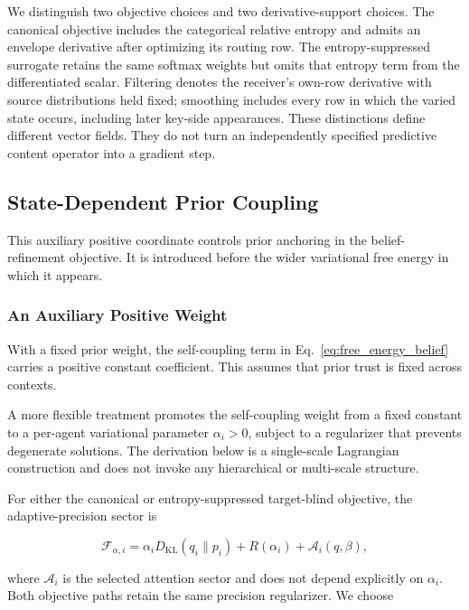 \documentclass[twoside,11pt]{article}
\begin{document}
We distinguish two objective choices and two derivative-support choices. The canonical objective includes the categorical relative entropy and admits an envelope derivative after optimizing its routing row. The entropy-suppressed surrogate retains the same softmax weights but omits that entropy term from the differentiated scalar. Filtering denotes the receiver's own-row derivative with source distributions held fixed; smoothing includes every row in which the varied state occurs, including later key-side appearances. These distinctions define different vector fields. They do not turn an independently specified predictive content operator into a gradient step.

\subsection{State-Dependent Prior Coupling}
\label{sec:state_dependent_precision}

This auxiliary positive coordinate controls prior anchoring in the belief-refinement objective. It is introduced before the wider variational free energy in which it appears.

\subsubsection{An Auxiliary Positive Weight}

With a fixed prior weight, the self-coupling term in Eq.~\eqref{eq:free_energy_belief} carries a positive constant coefficient. This assumes that prior trust is fixed across contexts.

A more flexible treatment promotes the self-coupling weight from a fixed constant to a per-agent variational parameter $\alpha_i > 0$, subject to a regularizer that prevents degenerate solutions. The derivation below is a single-scale Lagrangian construction and does not invoke any hierarchical or multi-scale structure.

For either the canonical or entropy-suppressed target-blind objective, the adaptive-precision sector is

\begin{equation}
\mathcal{F}_{\alpha,i}
=\alpha_iD_{\mathrm{KL}}(q_i\|p_i)+R(\alpha_i)+\mathcal{A}_i(q,\beta),
\label{eq:free_energy_adaptive}
\end{equation}

where $\mathcal{A}_i$ is the selected attention sector and does not depend explicitly on $\alpha_i$. Both objective paths retain the same precision regularizer. We choose
\end{document}
